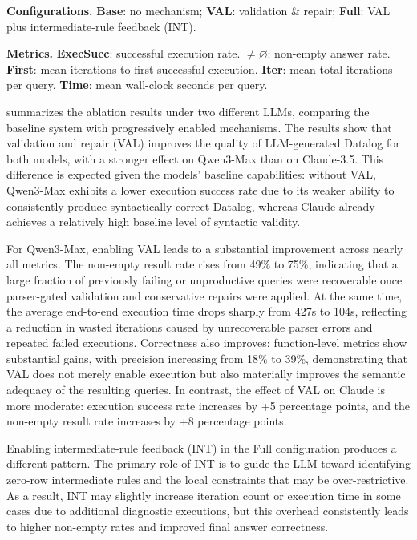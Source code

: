 \begin{table}[t]
  \vspace{1mm}
  \begin{minipage}{0.98\columnwidth}
  \footnotesize
  \setlength{\parindent}{0pt}
  \setlength{\parskip}{0.25ex}
  \textbf{Configurations.}
  \textbf{Base}: no mechanism; \textbf{VAL}: validation \& repair;
  \textbf{Full}: VAL plus intermediate-rule feedback (INT).

  \textbf{Metrics.}
  \textbf{ExecSucc}: successful execution rate.
  \textbf{$\ne\varnothing$}: non-empty answer rate.
  \textbf{First}: mean iterations to first successful execution.
  \textbf{Iter}: mean total iterations per query.
  \textbf{Time}: mean wall-clock seconds per query.
  \end{minipage}
\end{table}

 summarizes the ablation results under two different LLMs, comparing the baseline system with progressively enabled mechanisms.
The results show that validation and repair (VAL) improves the quality of LLM-generated Datalog for both models, with a stronger effect on Qwen3-Max than on Claude-3.5. This difference is expected given the models' baseline capabilities: without VAL, Qwen3-Max exhibits a lower execution success rate due to its weaker ability to consistently produce syntactically correct \souffle{} Datalog, whereas Claude already achieves a relatively high baseline level of syntactic validity.

For Qwen3-Max, enabling VAL leads to a substantial improvement across nearly all metrics. The non-empty result rate rises from 49\% to 75\%, indicating that a large fraction of previously failing or unproductive queries were recoverable once parser-gated validation and conservative repairs were applied. At the same time, the average end-to-end execution time drops sharply from 427s to 104s, reflecting a reduction in wasted iterations caused by unrecoverable parser errors and repeated failed executions. Correctness also improves: function-level metrics show substantial gains, with precision increasing from 18\% to 39\%, demonstrating that VAL does not merely enable execution but also materially improves the semantic adequacy of the resulting queries.
In contrast, the effect of VAL on Claude is more moderate: execution success rate increases by +5 percentage points, and the non-empty result rate increases by +8 percentage points.

Enabling intermediate-rule feedback (INT) in the Full configuration produces a different pattern. The primary role of INT is to guide the LLM toward identifying zero-row intermediate rules and the local constraints that may be over-restrictive. As a result, INT may slightly increase iteration count or execution time in some cases due to additional diagnostic executions, but this overhead consistently leads to higher non-empty rates and improved final answer correctness.

